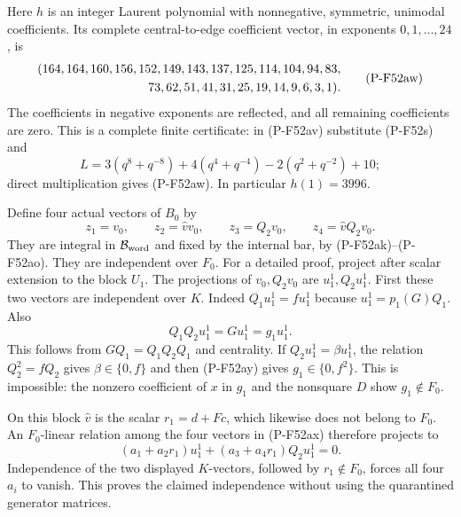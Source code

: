 \documentclass[11pt,a4paper]{article}
\begin{document}
Here $h$ is an integer Laurent polynomial with nonnegative,
symmetric, unimodal coefficients. Its complete central-to-edge
coefficient vector, in exponents $0,1,\ldots,24$, is
\[
 \begin{split}
 (164,164,160,156,152,149,143,137,125,114,104,94,83,\\
 \hspace{18mm}73,62,51,41,31,25,19,14,9,6,3,1).
 \end{split}                                                    \tag{P-F52aw}
\]
The coefficients in negative exponents are reflected, and
all remaining coefficients are zero. This is a complete
finite certificate: in (P-F52av) substitute (P-F52s) and
\[
       L=3(q^8+q^{-8})+4(q^4+q^{-4})
                        -2(q^2+q^{-2})+10;
\]
direct multiplication gives (P-F52aw). In particular
$h(1)=3996$.

Define four actual vectors of $B_0$ by
\[
  z_1=v_0,\qquad z_2=\widehat v v_0,\qquad
  z_3=Q_2v_0,\qquad z_4=\widehat v Q_2v_0.
                                                               \tag{P-F52ax}
\]
They are integral in $\mathcal B_{\rm word}$ and fixed by
the internal bar, by (P-F52ak)--(P-F52ao).
They are independent over $F_0$.
For a detailed proof, project after scalar extension to
the block $U_1$. The projections of $v_0,Q_2v_0$ are
$u_1^1,Q_2u_1^1$. First these two vectors are independent
over $K$. Indeed $Q_1u_1^1=fu_1^1$ because
$u_1^1=p_1(G)Q_1$. Also
\[
           Q_1Q_2u_1^1=Gu_1^1=g_1u_1^1.
                                                               \tag{P-F52ay}
\]
This follows from $GQ_1=Q_1Q_2Q_1$ and centrality.
If $Q_2u_1^1=\beta u_1^1$, the relation
$Q_2^2=fQ_2$ gives $\beta\in\{0,f\}$ and then
(P-F52ay) gives $g_1\in\{0,f^2\}$.
This is impossible: the nonzero coefficient of $x$ in
$g_1$ and the nonsquare $D$ show $g_1\notin F_0$.

On this block $\widehat v$ is the scalar
$r_1=d+Fc$, which likewise does not belong to $F_0$.
An $F_0$-linear relation among the four vectors in
(P-F52ax) therefore projects to
\[
       (a_1+a_2r_1)u_1^1+
                         (a_3+a_4r_1)Q_2u_1^1=0.
\]
Independence of the two displayed $K$-vectors, followed by
$r_1\notin F_0$, forces all four $a_i$ to vanish.
This proves the claimed independence without using the
quarantined generator matrices.
\end{document}
